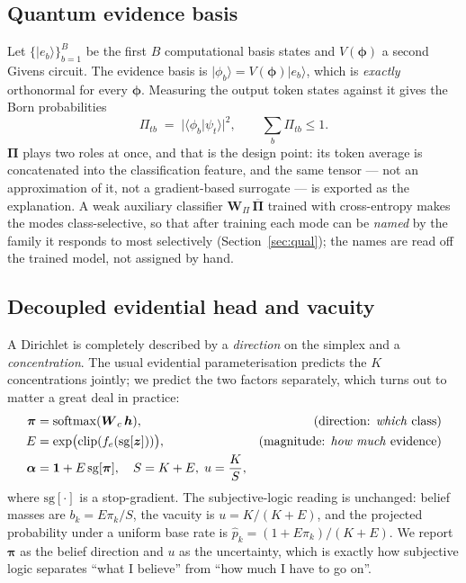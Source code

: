 \documentclass[conference]{IEEEtran}
\newcommand{\bs}[1]{\boldsymbol{#1}}
\newcommand{\ket}[1]{\lvert #1 \rangle}
\newcommand{\braket}[2]{\langle #1 \vert #2 \rangle}
\begin{document}
\subsection{Quantum evidence basis}
Let $\{\ket{e_{b}}\}_{b=1}^{B}$ be the first $B$ computational basis states and
$V(\bs{\phi})$ a second Givens circuit. The evidence basis is
$\ket{\phi_{b}} = V(\bs{\phi})\ket{e_{b}}$, which is \emph{exactly} orthonormal for
every $\bs{\phi}$. Measuring the output token states against it gives the Born
probabilities
\begin{equation}
\Pi_{tb} \;=\; \bigl\lvert \braket{\phi_{b}}{\psi_{t}} \bigr\rvert^{2},
\qquad \textstyle\sum_{b}\Pi_{tb}\le 1 .
\label{eq:basis}
\end{equation}
$\bs{\Pi}$ plays two roles at once, and that is the design point: its token average
is concatenated into the classification feature, and the same tensor --- not an
approximation of it, not a gradient-based surrogate --- is exported as the
explanation. A weak auxiliary classifier $\bs{W}_{\Pi}\,\overline{\bs{\Pi}}$ trained
with cross-entropy makes the modes class-selective, so that after training each mode
can be \emph{named} by the family it responds to most selectively
(Section~\ref{sec:qual}); the names are read off the trained model, not assigned by
hand.

\subsection{Decoupled evidential head and vacuity}
A Dirichlet is completely described by a \emph{direction} on the simplex and a
\emph{concentration}. The usual evidential parameterisation
\cite{sensoy2018edl} predicts the $K$ concentrations jointly; we predict the two
factors separately, which turns out to matter a great deal in practice:
\begin{align}
\bs{\pi} &= \mathrm{softmax}(\bs{W}_{c}\,\bs{h}),
&\text{(direction: \emph{which} class)}\nonumber\\
E &= \exp\bigl(\mathrm{clip}(f_{e}(\mathrm{sg}[\bs{z}]))\bigr),
&\text{(magnitude: \emph{how much} evidence)}\nonumber\\
\bs{\alpha} &= \bs{1} + E\,\mathrm{sg}[\bs{\pi}], \quad S = K + E,\;
u = \frac{K}{S},&
\label{eq:vacuity}
\end{align}
where $\mathrm{sg}[\cdot]$ is a stop-gradient. The subjective-logic reading is
unchanged: belief masses are $b_{k}=E\pi_{k}/S$, the vacuity is $u=K/(K+E)$, and
the projected probability under a uniform base rate is
$\hat{p}_{k}=(1+E\pi_{k})/(K+E)$. We report $\bs{\pi}$ as the belief direction and
$u$ as the uncertainty, which is exactly how subjective logic separates ``what I
believe'' from ``how much I have to go on''.
\end{document}
